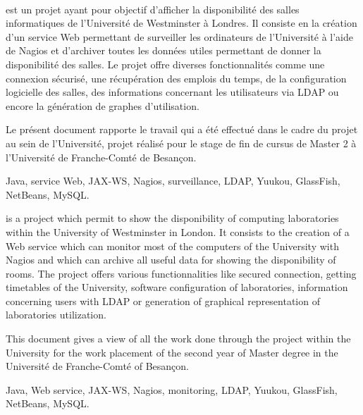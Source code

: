 ~
\vfill


{\YuukouII} est un projet ayant pour objectif d'afficher la disponibilit\'e des salles informatiques de l'Universit\'e de Westminster \`a Londres.
Il consiste en la cr\'eation d'un service Web permettant de surveiller les ordinateurs de l'Universit\'e \`a l'aide de Nagios et d'archiver toutes les donn\'ees utiles permettant de donner la disponibilit\'e des salles.
Le projet offre diverses fonctionnalit\'es comme une connexion s\'ecuris\'e, une r\'ecup\'eration des emplois du temps, de la configuration logicielle des salles, des informations concernant les utilisateurs via LDAP ou encore la g\'en\'eration de graphes d'utilisation.

Le pr\'esent document rapporte le travail qui a \'et\'e effectu\'e dans le cadre du projet {\YuukouII} au sein de l'Universit\'e, projet r\'ealis\'e pour le stage de fin de cursus de Master 2 \`a l'Universit\'e de Franche-Comt\'e de Besan\c{c}on.

\vspace{0.5cm}


Java, service Web, JAX-WS, Nagios, surveillance, LDAP, Yuukou, GlassFish, NetBeans, MySQL.

\vspace{1cm}


{\YuukouII} is a project which permit to show the disponibility of computing laboratories within the University of Westminster in London.
It consists to the creation of a Web service which can monitor most of the computers of the University with Nagios and which can archive all useful data for showing the disponibility of rooms.
The project offers various functionnalities like secured connection, getting timetables of the University, software configuration of laboratories, information concerning users with LDAP or generation of graphical representation of laboratories utilization.

This document gives a view of all the work done through the project {\YuukouII} within the University for the work placement of the second year of Master degree in the Universit\'e de Franche-Comt\'e of Besan\c{c}on.

\vspace{0.5cm}


Java, Web service, JAX-WS, Nagios, monitoring, LDAP, Yuukou, GlassFish, NetBeans, MySQL.

\vfill
